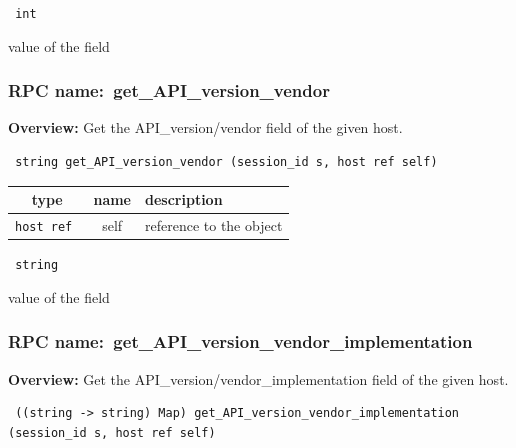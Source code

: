\vspace{0.3cm}

{\tt 
int
}


value of the field
\vspace{0.3cm}
\vspace{0.3cm}
\vspace{0.3cm}
\subsubsection{RPC name:~get\_API\_version\_vendor}

{\bf Overview:} 
Get the API\_version/vendor field of the given host.

\begin{verbatim} string get_API_version_vendor (session_id s, host ref self)\end{verbatim}



 
\vspace{0.3cm}
\begin{tabular}{|c|c|p{7cm}|}
 \hline
{\bf type} & {\bf name} & {\bf description} \\ \hline
{\tt host ref } & self & reference to the object \\ \hline 

\end{tabular}

\vspace{0.3cm}

{\tt 
string
}


value of the field
\vspace{0.3cm}
\vspace{0.3cm}
\vspace{0.3cm}
\subsubsection{RPC name:~get\_API\_version\_vendor\_implementation}

{\bf Overview:} 
Get the API\_version/vendor\_implementation field of the given host.

\begin{verbatim} ((string -> string) Map) get_API_version_vendor_implementation (session_id s, host ref self)\end{verbatim}



